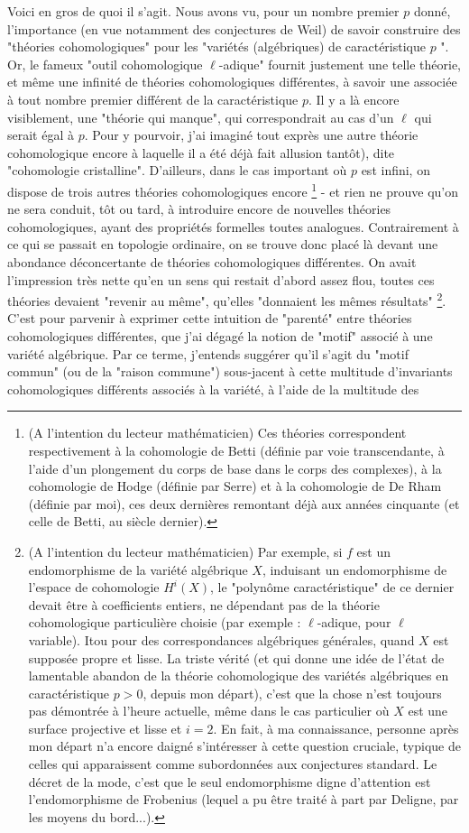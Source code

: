 Voici en gros de quoi il s'agit. Nous avons vu, pour un nombre premier $p$ donné, l'importance (en vue notamment des conjectures de Weil) de savoir construire des "théories cohomologiques" pour les "variétés (algébriques) de caractéristique $p$ ". Or, le fameux "outil cohomologique $\ell$-adique" fournit justement une telle théorie, et même une infinité de théories cohomologiques différentes, à savoir une associée à tout nombre premier différent de la caractéristique $p$. Il y a là encore visiblement, une "théorie qui manque", qui correspondrait au cas d'un $\ell$ qui serait égal à $p$. Pour y pourvoir, j'ai imaginé tout exprès une autre théorie cohomologique encore à laquelle il a été déjà fait allusion tantôt), dite "cohomologie cristalline". D'ailleurs, dans le cas important où $p$ est infini, on dispose de trois autres théories cohomologiques encore \footnote{(A l’intention du lecteur mathématicien) Ces théories correspondent respectivement à la cohomologie de Betti (définie par voie transcendante, à l'aide d'un plongement du corps de base dans le corps des complexes), à la cohomologie de Hodge (définie par Serre) et à la cohomologie de De Rham (définie par moi), ces deux dernières remontant déjà aux années cinquante (et celle de Betti, au siècle dernier).} - et rien ne prouve qu'on ne sera conduit, tôt ou tard, à introduire encore de nouvelles théories cohomologiques, ayant des propriétés formelles toutes analogues. Contrairement à ce qui se passait en topologie ordinaire, on se trouve donc placé là devant une abondance déconcertante de théories cohomologiques différentes. On avait l'impression très nette qu'en un sens qui restait d'abord assez flou, toutes ces théories devaient "revenir au même", qu'elles "donnaient les mêmes résultats" \footnote{(A l'intention du lecteur mathématicien) Par exemple, si $f$ est un endomorphisme de la variété algébrique $X$, induisant un endomorphisme de l'espace de cohomologie $H^{i}(X)$, le "polynôme caractéristique" de ce dernier devait être à coefficients entiers, ne dépendant pas de la théorie cohomologique particulière choisie (par exemple : $\ell$-adique, pour $\ell$ variable). Itou pour des correspondances algébriques générales, quand $X$ est supposée propre et lisse. La triste vérité (et qui donne une idée de l'état de lamentable abandon de la théorie cohomologique des variétés algébriques en caractéristique $p>0$, depuis mon départ), c'est que la chose n'est toujours pas démontrée à l'heure actuelle, même dans le cas particulier où $X$ est une surface projective et lisse et $i=2$. En fait, à ma connaissance, personne après mon départ n'a encore daigné s'intéresser à cette question cruciale, typique de celles qui apparaissent comme subordonnées aux conjectures standard. Le décret de la mode, c'est que le seul endomorphisme digne d'attention est l'endomorphisme de Frobenius (lequel a pu être traité à part par Deligne, par les moyens du bord...).}. C’est pour parvenir à exprimer cette intuition de "parenté" entre théories cohomologiques différentes, que j'ai dégagé la notion de "motif" associé à une variété algébrique. Par ce terme, j'entends suggérer qu'il s'agit du "motif commun" (ou de la "raison commune") sous-jacent à cette multitude d'invariants cohomologiques différents associés à la variété, à l'aide de la multitude des 